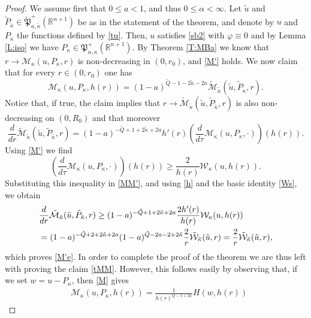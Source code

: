 \documentclass[11pt]{amsart}
\theoremstyle{plain}
\numberwithin{equation}{section}
\begin{document}
\begin{proof}
We assume first that $0\le a<1$, and thus $0\le \alpha <\infty$. Let $\tilde u$ and $\tilde P_{\tilde \kappa}\in \tilde{\mathfrak P}^+_{a,\tilde \kappa}({\mathbb R}^{n+1})$ be as in the statement of the theorem, and denote by $u$ and $P_\kappa$ the functions defined by \eqref{tu}. Then, $u$ satisfies \eqref{sb2} with ${\varphi} \equiv 0$ and by Lemma \ref{L:iso} we have $P_{\kappa}\in \mathfrak P^+_{\alpha,\kappa}({\mathbb R}^{n+1})$. By Theorem \ref{T:MBa} we know that $r\to \mathcal M_\kappa(u,P_\kappa,r)$ is non-decreasing in $(0,r_0)$, and \eqref{M'} holds. We now claim that for every $r\in (0,r_0)$ one has
\begin{equation}\label{tMM}
\mathcal M_{\kappa}(u,P_{\kappa},h(r)) = (1-a)^{\tilde Q - 1 - 2 \tilde \kappa - 2a} \tilde{\mathcal M}_{\tilde \kappa}(\tilde u,\tilde P_{\tilde \kappa},r).
\end{equation}
Notice that, if true, the claim implies that $r\to \tilde{\mathcal M}_{\tilde \kappa}(\tilde u,\tilde P_{\tilde \kappa},r)$ is
also non-decreasing on $(0,R_0)$ and that moreover
\begin{equation}\label{MM'}
\frac{d}{dr} \tilde{\mathcal M}_{\tilde \kappa}(\tilde u,\tilde P_{\tilde \kappa},r) =  (1-a)^{-\tilde Q + 1 + 2 \tilde \kappa + 2a} h'(r) \left(\frac{d}{d\tau} \mathcal M_{\kappa}(u,P_{\kappa},\cdot)\right)(h(r)).
\end{equation}
Using \eqref{M'} we find
\[
\left(\frac{d}{d\tau}\mathcal M_\kappa(u,P_\kappa,\cdot)\right)(h(r)) \ge \frac{2}{h(r)} \mathcal W_\kappa(u,h(r)).
\]
Substituting this inequality in \eqref{MM'}, and using \eqref{h} and the basic identity \eqref{Ws}, we obtain
\begin{align}\label{Ms}
& \frac{d}{dr} \tilde{\mathcal M}_{\tilde \kappa}(\tilde u,\tilde P_{\tilde \kappa},r) \ge (1-a)^{-\tilde Q + 1 + 2 \tilde \kappa + 2a}  \frac{2h'(r)}{h(r)} \mathcal W_\kappa(u,h(r))
\\
& =  (1-a)^{-\tilde Q + 2 + 2 \tilde \kappa + 2a}  (1-a)^{\tilde Q-2a -2+2\tilde \kappa} \frac 2r  \tilde{\mathcal W}_{\tilde \kappa}(\tilde u,r) = \frac 2r  \tilde{\mathcal W}_{\tilde \kappa}(\tilde u,r),
\notag
\end{align}
which proves \eqref{M'e}. In order to complete the proof of the theorem we are thus left with proving the claim \eqref{tMM}. However, this follows easily by observing that, if we set $w = u - P_\kappa$, then \eqref{M} gives
\begin{align*}
& \mathcal M_{\kappa}(u,P_{\kappa},h(r)) = \frac{1}{h(r)^{Q-1+2\kappa}} H(w,h(r))

\end{align*}
\end{proof}
\end{document}
